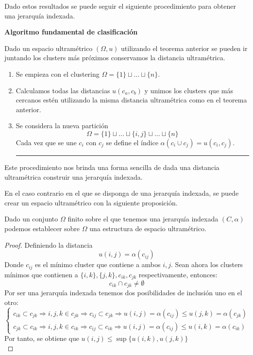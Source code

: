 \noindent Dado estos resultados se puede seguir el siguiente procedimiento para obtener una jerarquía indexada.   

\noindent \textbf{Algoritmo fundamental de clasificación}

\noindent Dado un espacio ultramétrico $(\Omega, u)$ utilizando el teorema anterior se pueden ir juntando los clusters más próximos conservamos la distancia ultramétrica. \\
\begin{enumerate}
\hrule
\item Se empieza con el clustering $\Omega= \lbrace 1\rbrace \sqcup \ldots \sqcup\lbrace n \rbrace$. 
\item Calculamos todas las distancias $u(c_a,c_b)$ y unimos los clusters que más cercanos estén utilizando la misma distancia ultramétrica como en el teorema anterior.
\item Se considera la nueva partición
\begin{equation}
\Omega= \lbrace 1\rbrace \sqcup\ldots \sqcup \lbrace i,j\rbrace \sqcup \ldots \sqcup\lbrace n \rbrace
\end{equation}
Cada vez que se une $c_i$ con $c_j$ se define el índice $\alpha(c_i\cup c_j)=u(c_i,c_j)$.\\
\hrule
\end{enumerate}


\noindent Este procedimiento nos brinda una forma sencilla de dada una distancia ultramétrica construir una jerarquía indexada. 

\noindent En el caso contrario en el que se disponga de una jerarquía indexada, se puede crear un espacio ultramétrico con la siguiente proposición. 
\begin{propo}
Dado un conjunto $\Omega$ finito sobre el que tenemos una jerarquía indexada $(C,\alpha)$ podemos establecer sobre $\Omega$ una estructura de espacio ultramétrico. 
\begin{proof}
Definiendo la distancia
\begin{equation}
u(i,j)=\alpha(c_{ij})
\end{equation}
Donde $c_{ij}$ es el mínimo cluster que contiene a ambos $i,j$. Sean ahora los clusters mínimos que contienen a $\lbrace i,k\rbrace,\lbrace j,k\rbrace, c_{ik},c_{jk}$ respectivamente, entonces:
\begin{equation}
c_{ik}\cap c_{jk}\neq \emptyset
\end{equation}
Por ser una jerarquía indexada tenemos dos posibilidades de inclusión uno en el otro:
\begin{equation}
\begin{cases}
c_{ik}\subset c_{jk}\Rightarrow i,j,k\in c_{jk}\Rightarrow c_{ij}\subset c_ {jk}\Rightarrow u(i,j)=\alpha(c_{ij})\leq u(j,k)=\alpha(c_{jk})\\
c_{jk}\subset c_{ik}\Rightarrow i,j,k\in c_{ik}\Rightarrow c_{ij}\subset c_ {ik}\Rightarrow u(i,j)=\alpha(c_{ij})\leq u(i,k)=\alpha(c_{ik})
\end{cases}
\end{equation}
Por tanto, se obtiene que $u(i,j)\leq \sup\lbrace u(i,k),u(j,k) \rbrace$\\
\qedhere
\end{proof}
\end{propo}


